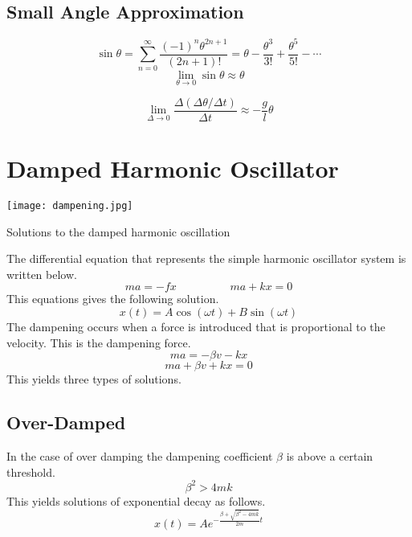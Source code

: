 \vspace{1cm}

\subsection{Small Angle Approximation}
$$\sin \theta=\sum_{n=0}^{\infty} \frac{(-1)^n\theta^{2n+1}}{(2n+1)!}=\theta-\frac{\theta^3}{3!}+\frac{\theta^5}{5!}-\cdots$$
$$\lim_{\theta \rightarrow 0} \sin \theta \approx \theta$$

$$\lim_{\Delta \rightarrow 0} \frac{\Delta (\Delta \theta / \Delta t)}{\Delta t}\approx-\frac{g}{l}\theta$$


\section{Damped Harmonic Oscillator}
\begin{marginfigure}%
  \texttt{[image: dampening.jpg]}
  \caption{Solutions to the damped harmonic oscillation}
  \label{fig:marginfig}
\end{marginfigure}
\normalsize
The differential equation that represents the simple harmonic oscillator system is written below.
$$ma=-fx \hspace{2cm} ma+kx=0$$
This equations gives the following solution.
$$x(t)=A\cos(\omega t)+B\sin(\omega t) $$
The dampening occurs when a force is introduced that is proportional to the velocity.  This is the dampening force.
$$ma=-\beta v-kx$$
$$ma+\beta v+kx=0$$
This yields three types of solutions.
\subsection{Over-Damped}
In the case of over damping the dampening coefficient $\beta$ is above a certain threshold. 
$$\beta^2>4mk$$
This yields solutions of exponential decay as follows.
$$x(t)=Ae^{-\frac{\beta+\sqrt{\beta^2-4mk}}{2m}t}$$
